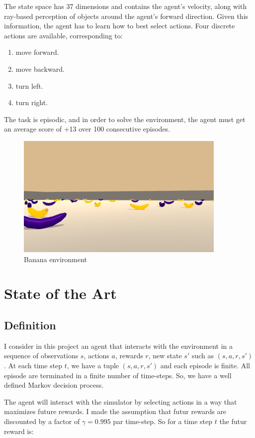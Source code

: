 \documentclass[12pt]{article}
\begin{document}
The state space has 37 dimensions and contains the agent's velocity, along with ray-based perception of objects around the agent's forward direction. Given this information, the agent has to learn how to best select actions. Four discrete actions are available, corresponding to:
\begin{enumerate}
  \item move forward.
  \item move backward.
  \item turn left.
  \item turn right.
\end{enumerate}

The task is episodic, and in order to solve the environment, the agent must get an average score of +13 over 100 consecutive episodes.

\begin{figure}[!htbp]
  \includegraphics[width=0.9\textwidth]{../PNG/env.png}
  \caption{Banana environment}
  \label{fig:banana_environment}
\end{figure}

\section{State of the Art}
\subsection{Definition}
I consider in this project an agent that interacts with the environment in a sequence of observations $s$, actions $a$, rewards $r$, new state $s'$ such as $(s,a,r,s')$.
At each time step $t$, we have a tuple $(s,a,r,s')$  and each episode is finite. All episode are terminated in a finite number of time-steps. 
So, we have a well defined Markov decision process. 
 
The agent will interact with the simulator by selecting actions in a way that maximizes future rewards. 
I made the assumption that futur rewards are discounted by a factor of $\gamma =0.995$ par time-step. So for a time step $t$ the futur reward is:
\end{document}
